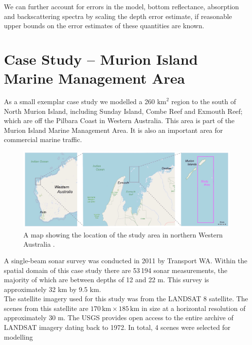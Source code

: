 \documentclass[12pt]{article}
\numberwithin{equation}{section}
\begin{document}
We can further account for errors in the model, bottom reflectance, absorption and 
backscattering spectra by scaling the depth error estimate, if reasonable upper 
bounds on the error estimates of these quantities are known. 

\section{Case Study -- Murion Island Marine Management Area}\label{case_study}

As a small exemplar case study we modelled a 260 $\text{km}^2$ region to the south 
of North Murion Island, including Sunday Island, Combe Reef and Exmouth Reef; which 
are off the Pilbara Coast in Western Australia. This area is part of the Murion 
Island Marine Management Area. It is also an important area for commercial marine 
traffic.

\begin{figure}[H]
\centering
\includegraphics[width=1.0\textwidth]{study_area_map.jpg}
\caption{A map showing the location of the study area in northern Western Australia \cite{open_street_maps}.}
\end{figure}

A single-beam sonar survey was conducted in 2011 by Transport WA. Within the spatial 
domain of this case study there are 53\,194 sonar measurements, the majority of 
which are between depths of 12 and 22 m. This survey is approximately 32 km by 9.5 km. \\

The satellite imagery used for this study was from the LANDSAT 8 satellite. The scenes from 
this satellite are $170\,\text{km} \times 185\,\text{km}$ in size at a horizontal resolution of 
approximately 30 m. The USGS provides open access to the entire archive of LANDSAT imagery 
dating back to 1972. In total, 4 scenes were selected for modelling
\end{document}
